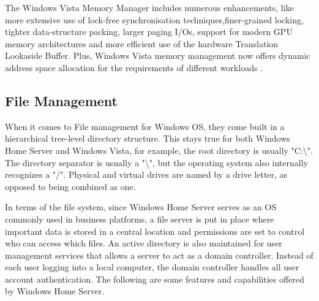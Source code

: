 \documentclass[a4paper, 12pt]{article}
\begin{document}
The Windows Vista Memory Manager includes numerous enhancements, like more extensive use of lock-free synchronisation techniques,finer-grained locking, tighter data-structure packing, larger paging I/Os, support for modern GPU memory architectures and more efficient use of the hardware Translation Lookaside Buffer. Plus, Windows Vista memory management now offers dynamic address space allocation for the requirements of different workloads \parencite{russinovich2007inside}.

\subsection{File Management}
When it comes to File management for Windows OS, they come built in a hierarchical tree-level directory structure. This stays true for both Windows Home Server and Windows Vista, for example, the root directory is usually "C:\textbackslash". The directory separator is usually a "\textbackslash", but the operating system also internally recognizes a "/". Physical and virtual drives are named by a drive letter, as opposed to being combined as one.

In terms of the file system, since Windows Home Server serves as an OS commonly used in business platforms, a file server is put in place where important data is stored in a central location and permissions are set to control who can access which files. An active directory is also maintained for user management services that allows a server to act as a domain controller. Instead of each user logging into a local computer, the domain controller handles all user account authentication. The following are some features and capabilities offered by Windows Home Server. 
\end{document}

